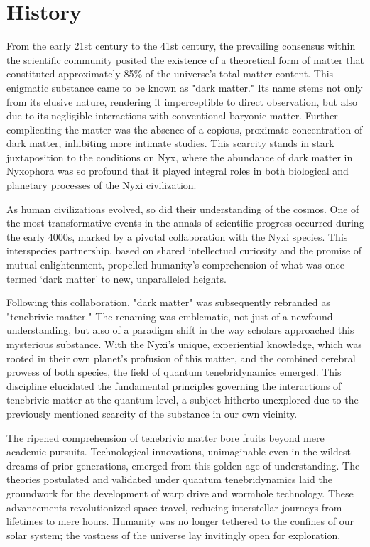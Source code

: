 \section{History}
From the early 21st century to the 41st century, the prevailing consensus within the scientific community posited the existence of a theoretical form of matter that constituted approximately 85\% of the universe's total matter content. This enigmatic substance came to be known as "dark matter." Its name stems not only from its elusive nature, rendering it imperceptible to direct observation, but also due to its negligible interactions with conventional baryonic matter. Further complicating the matter was the absence of a copious, proximate concentration of dark matter, inhibiting more intimate studies. This scarcity stands in stark juxtaposition to the conditions on Nyx, where the abundance of dark matter in Nyxophora was so profound that it played integral roles in both biological and planetary processes of the Nyxi civilization.

As human civilizations evolved, so did their understanding of the cosmos. One of the most transformative events in the annals of scientific progress occurred during the early 4000s, marked by a pivotal collaboration with the Nyxi species. This interspecies partnership, based on shared intellectual curiosity and the promise of mutual enlightenment, propelled humanity's comprehension of what was once termed `dark matter' to new, unparalleled heights.

Following this collaboration, "dark matter" was subsequently rebranded as "tenebrivic matter." The renaming was emblematic, not just of a newfound understanding, but also of a paradigm shift in the way scholars approached this mysterious substance. With the Nyxi's unique, experiential knowledge, which was rooted in their own planet's profusion of this matter, and the combined cerebral prowess of both species, the field of quantum tenebridynamics emerged. This discipline elucidated the fundamental principles governing the interactions of tenebrivic matter at the quantum level, a subject hitherto unexplored due to the previously mentioned scarcity of the substance in our own vicinity.

The ripened comprehension of tenebrivic matter bore fruits beyond mere academic pursuits. Technological innovations, unimaginable even in the wildest dreams of prior generations, emerged from this golden age of understanding. The theories postulated and validated under quantum tenebridynamics laid the groundwork for the development of warp drive and wormhole technology. These advancements revolutionized space travel, reducing interstellar journeys from lifetimes to mere hours. Humanity was no longer tethered to the confines of our solar system; the vastness of the universe lay invitingly open for exploration.

